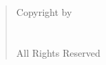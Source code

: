 \vspace*{\fill} 
\begin{quote} 
\centering 
Copyright by\\ 
\mylinespacing
\myname \\
\mylinespacing
\myyear \\
\mylinespacing
All Rights Reserved \\
\mylinespacing
\myoptpg
\end{quote}
\vspace*{\fill}

